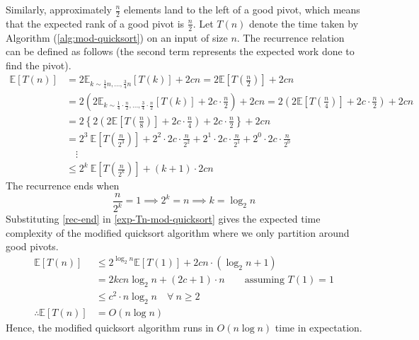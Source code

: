 \documentclass[9pt]{article}
\begin{document}
Similarly, approximately $\frac{n}{2}$ elements land to the left of a good pivot, which means that
the expected rank of a good pivot is $\frac{n}{2}$. Let $T(n)$ denote the time taken by Algorithm
(\ref{alg:mod-quicksort}) on an input of size $n$. The recurrence relation can be defined as follows
(the second term represents the expected work done to find the pivot).
\begin{equation}
    \label{exp-Tn-mod-quicksort}
    \begin{split}
        \mathbb{E}[T(n)] &= 2 \mathbb{E}_{k \sim \frac{1}{4}n, \dots, \frac{3}{4}n}[T(k)] + 2cn
        = 2 \mathbb{E}\left[T\left( \frac{n}{2} \right)\right] + 2cn \\
        &= 2 \left( 2 \mathbb{E}_{k \sim \frac{1}{4}\cdot\frac{n}{2}, \dots, \frac{3}{4}\cdot\frac{n}{2}}[T(k)] + 2c \cdot \frac{n}{2} \right) + 2cn
        = 2 \left( 2 \mathbb{E}\left[T\left( \frac{n}{4} \right)\right] + 2c \cdot \frac{n}{2} \right) + 2cn \\
        &= 2 \left\{ 2 \left( 2 \mathbb{E}\left[T\left( \frac{n}{8} \right)\right] + 2c \cdot \frac{n}{4} \right) + 2c \cdot \frac{n}{2} \right\} + 2cn \\
        &= 2^{3} \ \mathbb{E}\left[T\left( \frac{n}{2^{3}} \right)\right] + 2^{2} \cdot 2c \cdot \frac{n}{2^{2}} + 2^{1} \cdot 2c \cdot \frac{n}{2^{1}} + 2^{0} \cdot 2c \cdot \frac{n}{2^{0}} \\
        &\quad \vdots \\
        &\leq 2^{k} \ \mathbb{E}\left[ T\left( \frac{n}{2^{k}} \right) \right] + (k+1) \cdot 2cn
    \end{split}
\end{equation}
The recurrence ends when
\begin{equation}
    \label{rec-end}
    \frac{n}{2^{k}} = 1 \implies 2^{k} = n \implies k = \log_{2}{n}
\end{equation}
Substituting \eqref{rec-end} in \eqref{exp-Tn-mod-quicksort} gives the expected time complexity of the modified
quicksort algorithm where we only partition around good pivots.
\begin{equation}
    \label{exp-Tn-mod-quicksort-sol}
    \begin{split}
        \mathbb{E}[T(n)] &\leq 2^{\log_{2}{n}} \mathbb{E}[T(1)] + 2cn \cdot (\log_{2}{n} + 1) \\
        &= 2k cn \log_{2}{n} + (2c + 1) \cdot n \qquad \text{assuming } T(1) = 1 \\
        &\leq c^{2} \cdot n \log_{2}{n} \quad \forall \ n \geq 2 \\
        \therefore \mathbb{E}[T(n)] &= O(n \log{n})
    \end{split}
\end{equation}
Hence, the modified quicksort algorithm runs in $O(n \log{n})$ time in expectation.
\end{document}
